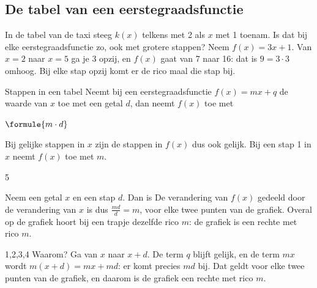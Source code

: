 
\begin{oefeningen}
\end{oefeningen}

\subsection{De tabel van een eerstegraadsfunctie}

In de tabel van de taxi steeg $k(x)$ telkens met 2 als $x$ met 1 toenam. Is dat bij elke eerstegraadsfunctie zo, ook met grotere stappen? Neem $f(x) = 3x + 1$. Van $x = 2$ naar $x = 5$ ga je 3 opzij, en $f(x)$ gaat van 7 naar 16: dat is $9 = 3 \cdot 3$ omhoog. Bij elke stap opzij komt er de rico maal die stap bij.

\begin{theorie}
\begin{stelling}{Stappen in een tabel}
Neemt bij een eerstegraadsfunctie $f(x) = mx + q$ de waarde van $x$ toe met een getal $d$, dan neemt $f(x)$ toe met

\vspace{1mm}
\qquad $\formule{m \cdot d}$

\vspace{1mm}
Bij gelijke stappen in $x$ zijn de stappen in $f(x)$ dus ook gelijk. Bij een stap 1 in $x$ neemt $f(x)$ toe met $m$.
\end{stelling}
\begin{alleenvoor}{5}
\begin{bewijs}
Neem een getal $x$ en een stap $d$. Dan is
De verandering van $f(x)$ gedeeld door de verandering van $x$ is dus $\tfrac{md}{d} = m$, voor elke twee punten van de grafiek. Overal op de grafiek hoort bij een trapje dezelfde rico $m$: de grafiek is een rechte met rico $m$.
\end{bewijs}
\end{alleenvoor}
\end{theorie}

\begin{alleenvoor}{1,2,3,4}
Waarom? Ga van $x$ naar $x + d$. De term $q$ blijft gelijk, en de term $mx$ wordt $m(x + d) = mx + md$: er komt precies $md$ bij. Dat geldt voor elke twee punten van de grafiek, en daarom is de grafiek een rechte met rico $m$.
\end{alleenvoor}

